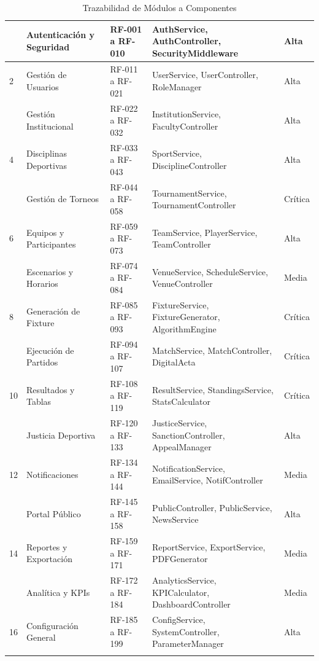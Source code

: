 \documentclass[12pt,a4paper]{article}
\begin{document}
\begin{longtable}{|>{\centering\arraybackslash}p{1cm}|>{\raggedright\arraybackslash}p{3.5cm}|>{\raggedright\arraybackslash}p{3.5cm}|>{\raggedright\arraybackslash}p{3.5cm}|>{\centering\arraybackslash}p{2.5cm}|}
1 & Autenticación y Seguridad & RF-001 a RF-010 & AuthService, AuthController, SecurityMiddleware & Alta \\
\hline
\rowcolor{rowgray}
2 & Gestión de Usuarios & RF-011 a RF-021 & UserService, UserController, RoleManager & Alta \\
\hline
3 & Gestión Institucional & RF-022 a RF-032 & InstitutionService, FacultyController & Alta \\
\hline
\rowcolor{rowgray}
4 & Disciplinas Deportivas & RF-033 a RF-043 & SportService, DisciplineController & Alta \\
\hline
5 & Gestión de Torneos & RF-044 a RF-058 & TournamentService, TournamentController & Crítica \\
\hline
\rowcolor{rowgray}
6 & Equipos y Participantes & RF-059 a RF-073 & TeamService, PlayerService, TeamController & Alta \\
\hline
7 & Escenarios y Horarios & RF-074 a RF-084 & VenueService, ScheduleService, VenueController & Media \\
\hline
\rowcolor{rowgray}
8 & Generación de Fixture & RF-085 a RF-093 & FixtureService, FixtureGenerator, AlgorithmEngine & Crítica \\
\hline
9 & Ejecución de Partidos & RF-094 a RF-107 & MatchService, MatchController, DigitalActa & Crítica \\
\hline
\rowcolor{rowgray}
10 & Resultados y Tablas & RF-108 a RF-119 & ResultService, StandingsService, StatsCalculator & Crítica \\
\hline
11 & Justicia Deportiva & RF-120 a RF-133 & JusticeService, SanctionController, AppealManager & Alta \\
\hline
\rowcolor{rowgray}
12 & Notificaciones & RF-134 a RF-144 & NotificationService, EmailService, NotifController & Media \\
\hline
13 & Portal Público & RF-145 a RF-158 & PublicController, PublicService, NewsService & Alta \\
\hline
\rowcolor{rowgray}
14 & Reportes y Exportación & RF-159 a RF-171 & ReportService, ExportService, PDFGenerator & Media \\
\hline
15 & Analítica y KPIs & RF-172 a RF-184 & AnalyticsService, KPICalculator, DashboardController & Media \\
\hline
\rowcolor{rowgray}
16 & Configuración General & RF-185 a RF-199 & ConfigService, SystemController, ParameterManager & Alta \\
\hline
\caption{Trazabilidad de Módulos a Componentes}
\end{longtable}
\end{document}
